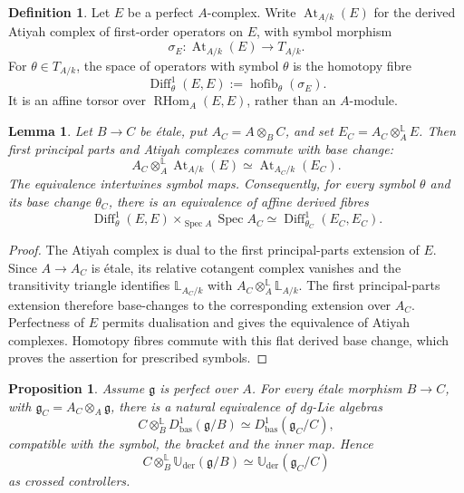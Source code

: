\documentclass[11pt,reqno,a4paper,dvipsnames,x11names]{amsart}
\numberwithin{equation}{section}
\theoremstyle{plain}
\newtheorem{proposition}[theorem]{Proposition}
\newtheorem{lemma}[theorem]{Lemma}
\theoremstyle{definition}
\newtheorem{definition}[theorem]{Definition}
\theoremstyle{remark}
\DeclareMathOperator{\Spec}{Spec}
\DeclareMathOperator{\RHom}{RHom}
\newcommand{\kk}{k}
\newcommand{\g}{\mathfrak g}
\newcommand{\Uder}{\mathbb U_{\mathrm{der}}}
\newcommand{\bbL}{\mathbb L}
\newcommand{\bas}{\mathrm{bas}}
\newcommand{\from}{\colon}
\begin{document}
\begin{definition}
Let \(E\) be a perfect \(A\)-complex. Write
\(\operatorname{At}_{A/\kk}(E)\) for the derived Atiyah complex of first-order operators on \(E\), with symbol morphism
\[
 \sigma_E\from\operatorname{At}_{A/\kk}(E)\longrightarrow T_{A/\kk}.
\]
For \(\theta\in T_{A/\kk}\), the space of operators with symbol \(\theta\) is the homotopy fibre
\[
 \operatorname{Diff}^1_\theta(E,E)
 :=\operatorname{hofib}_\theta(\sigma_E).
\]
It is an affine torsor over \(\RHom_A(E,E)\), rather than an \(A\)-module.
\end{definition}

\begin{lemma}\label{lem:first-order-etale-base-change}
Let \(B\to C\) be \'etale, put \(A_C=A\otimes_BC\), and set
\(E_C=A_C\otimes_A^{\mathbb L}E\). Then first principal parts and Atiyah complexes commute with base change:
\[
 A_C\otimes_A^{\mathbb L}\operatorname{At}_{A/\kk}(E)
 \simeq
 \operatorname{At}_{A_C/\kk}(E_C).
\]
The equivalence intertwines symbol maps. Consequently, for every symbol \(\theta\) and its base change \(\theta_C\), there is an equivalence of affine derived fibres
\[
 \operatorname{Diff}^1_\theta(E,E)\times_{\Spec A}\Spec A_C
 \simeq
 \operatorname{Diff}^1_{\theta_C}(E_C,E_C).
\]
\end{lemma}

\begin{proof}
The Atiyah complex is dual to the first principal-parts extension of \(E\). Since \(A\to A_C\) is \'etale, its relative cotangent complex vanishes and the transitivity triangle identifies
\(\bbL_{A_C/\kk}\) with
\(A_C\otimes_A^{\mathbb L}\bbL_{A/\kk}\). The first principal-parts extension therefore base-changes to the corresponding extension over \(A_C\). Perfectness of \(E\) permits dualisation and gives the equivalence of Atiyah complexes. Homotopy fibres commute with this flat derived base change, which proves the assertion for prescribed symbols.
\end{proof}

\begin{proposition}\label{prop:base-change-D}
Assume \(\g\) is perfect over \(A\). For every \'etale morphism \(B\to C\), with
\(\g_C=A_C\otimes_A\g\), there is a natural equivalence of dg-Lie algebras
\[
 C\otimes_B^{\mathbb L}D^1_{\bas}(\g/B)
 \simeq
 D^1_{\bas}(\g_C/C),
\]
compatible with the symbol, the bracket and the inner map. Hence
\[
 C\otimes_B^{\mathbb L}\Uder(\g/B)
 \simeq
 \Uder(\g_C/C)
\]
as crossed controllers.
\end{proposition}
\end{document}
